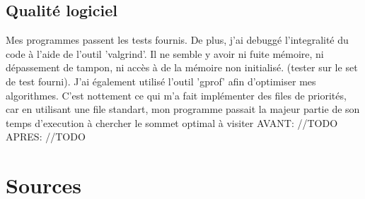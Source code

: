 \documentclass[a4paper,10pt]{article}
\begin{document}
      \subsection{Qualité logiciel}
	Mes programmes passent les tests fournis.\newline\newline
	De plus, j'ai debuggé l'integralité du code à l'aide de l'outil 'valgrind'.
	Il ne semble y avoir ni fuite mémoire, ni dépassement de tampon, ni accès à de la mémoire non initialisé.
	(tester sur le set de test fourni).\newline\newline
	J'ai également utilisé l'outil 'gprof' afin d'optimiser mes algorithmes. C'est nottement ce qui m'a fait implémenter des files de priorités,
	car en utilisant une file standart, mon programme passait la majeur partie de son temps d'execution à chercher le sommet optimal à visiter
	AVANT:
	//TODO
	APRES:
	//TODO

  \newpage
  \section{Sources}

    
\end{document}
